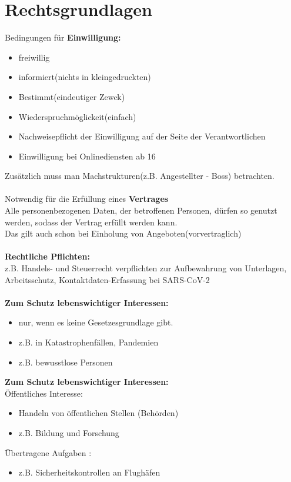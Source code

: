 \documentclass[12pt,a4paper]{article}
\begin{document}
    \section{Rechtsgrundlagen}
    Bedingungen für \textbf{Einwilligung:}\\
    \begin{itemize}
        \item freiwillig
        \item informiert(nichts in kleingedruckten)
        \item Bestimmt(eindeutiger Zewck)
        \item Wiederspruchmöglickeit(einfach)
        \item Nachweisepflicht der Einwilligung auf der Seite der Verantwortlichen
        \item Einwilligung bei Onlinediensten ab 16
    \end{itemize}
    Zusätzlich muss man Machstrukturen(z.B. Angestellter - Boss) betrachten. \\ \\
    Notwendig für die Erfüllung eines \textbf{Vertrages}\\
    Alle personenbezogenen Daten, der betroffenen Personen, dürfen so genutzt werden, sodass der Vertrag erfüllt werden kann. \\
    Das gilt auch schon bei Einholung von Angeboten(vorvertraglich) \\ \\
    \textbf{Rechtliche Pflichten:}\\
        z.B. Handels- und Steuerrecht verpflichten zur Aufbewahrung von Unterlagen, Arbeitsschutz, Kontaktdaten-Erfassung bei SARS-CoV-2
        \\ \\
    \textbf{Zum Schutz lebenswichtiger Interessen:}\\
        \begin{itemize}
            \item nur, wenn es keine Gesetzesgrundlage gibt.
            \item z.B. in Katastrophenfällen, Pandemien
            \item z.B. bewusstlose Personen
        \end{itemize}
    \textbf{Zum Schutz lebenswichtiger Interessen:}\\
    Öffentliches Interesse:
    \begin{itemize}
        \item Handeln von öffentlichen Stellen (Behörden)
        \item z.B. Bildung und Forschung
    \end{itemize}
    Übertragene Aufgaben :
    \begin{itemize}
        \item z.B. Sicherheitskontrollen an Flughäfen
    \end{itemize}
\end{document}
